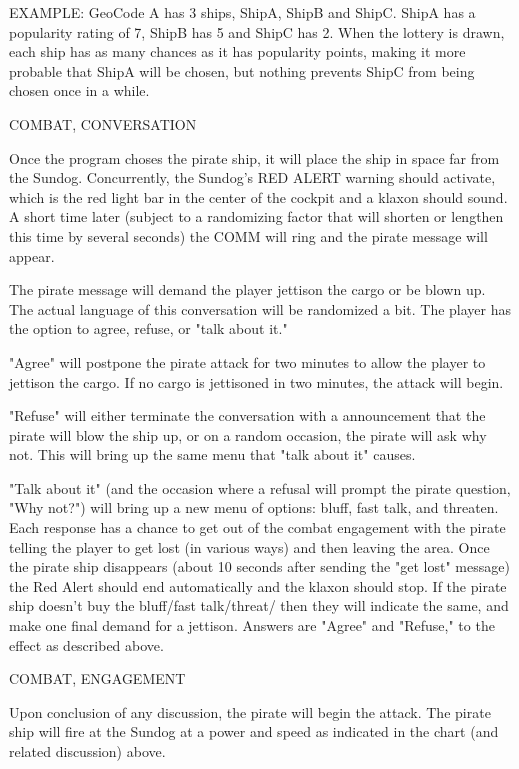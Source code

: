 \begin{itemize}
EXAMPLE:
GeoCode A has 3 ships, ShipA, ShipB and ShipC. ShipA has a popularity rating of 7, ShipB has 5 and ShipC has 2. When the lottery is drawn, each ship has as many chances as it has popularity points, making it more probable that ShipA will be chosen, but nothing prevents ShipC from being chosen once in a while.

COMBAT, CONVERSATION

Once the program choses the pirate ship, it will place the ship in space far from the Sundog. Concurrently, the Sundog's RED ALERT warning should activate, which is the red light bar in the center of the cockpit and a klaxon should sound. A short time later (subject to a randomizing factor that will shorten or lengthen this time by several seconds) the COMM will ring and the pirate message will appear. 

The pirate message will demand the player jettison the cargo or be blown up. The actual language of this conversation will be randomized a bit. The player has the option to agree, refuse, or "talk about it." 

"Agree" will postpone the pirate attack for two minutes to allow the player to jettison the cargo. If no cargo is jettisoned in two minutes, the attack will begin. 

"Refuse" will either terminate the conversation with a announcement that the pirate will blow the ship up, or on a random occasion, the pirate will ask why not. This will bring up the same menu that "talk about it" causes. 

"Talk about it" (and the occasion where a refusal will prompt the pirate question, "Why not?") will bring up a new menu of options: bluff, fast talk, and threaten. Each response has a chance to get out of the combat engagement with the pirate telling the player to get lost (in various ways) and then leaving the area. Once the pirate ship disappears (about 10 seconds after sending the "get lost" message) the Red Alert should end automatically and the klaxon should stop. If the pirate ship doesn't buy the bluff/fast talk/threat/ then they will indicate the same, and make one final demand for a jettison. Answers are "Agree" and "Refuse," to the effect as described above. 


COMBAT, ENGAGEMENT

Upon conclusion of any discussion, the pirate will begin the attack. The pirate ship will fire at the Sundog at a power and speed as indicated in the chart (and related discussion) above. 


\end{itemize}
